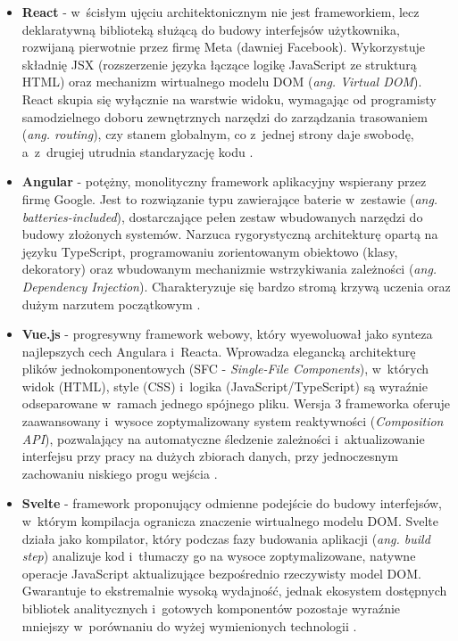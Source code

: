 \begin{itemize}
	\item \textbf{React} - w~ścisłym ujęciu architektonicznym nie jest frameworkiem, lecz deklaratywną biblioteką służącą do budowy interfejsów użytkownika, rozwijaną pierwotnie przez firmę Meta (dawniej Facebook).
	      Wykorzystuje składnię JSX (rozszerzenie języka łączące logikę JavaScript ze strukturą HTML) oraz mechanizm wirtualnego modelu DOM (\textit{ang. Virtual DOM}).
	      React skupia się wyłącznie na warstwie widoku, wymagając od programisty samodzielnego doboru zewnętrznych narzędzi do zarządzania trasowaniem (\textit{ang. routing}), czy stanem globalnym, co z~jednej strony daje swobodę, a~z~drugiej utrudnia standaryzację kodu \cite{react_dev_learn}.

	\item \textbf{Angular} - potężny, monolityczny framework aplikacyjny wspierany przez firmę Google.
	      Jest to rozwiązanie typu zawierające baterie w~zestawie (\textit{ang. batteries-included}), dostarczające pełen zestaw wbudowanych narzędzi do budowy złożonych systemów.
	      Narzuca rygorystyczną architekturę opartą na języku TypeScript, programowaniu zorientowanym obiektowo (klasy, dekoratory) oraz wbudowanym mechanizmie wstrzykiwania zależności (\textit{ang. Dependency Injection}).
	      Charakteryzuje się bardzo stromą krzywą uczenia oraz dużym narzutem początkowym \cite{angular_overview}.

	\item \textbf{Vue.js} - progresywny framework webowy, który wyewoluował jako synteza najlepszych cech Angulara i~Reacta.
	      Wprowadza elegancką architekturę plików jednokomponentowych (SFC - \textit{Single-File Components}), w~których widok (HTML), style (CSS) i~logika (JavaScript/TypeScript) są wyraźnie odseparowane w~ramach jednego spójnego pliku.
	      Wersja 3 frameworka oferuje zaawansowany i~wysoce zoptymalizowany system reaktywności (\textit{Composition API}), pozwalający na automatyczne śledzenie zależności i~aktualizowanie interfejsu przy pracy na dużych zbiorach danych, przy jednoczesnym zachowaniu niskiego progu wejścia \cite{vuejs_guide_introduction}.

	\item \textbf{Svelte} - framework proponujący odmienne podejście do budowy interfejsów, w~którym kompilacja ogranicza znaczenie wirtualnego modelu DOM.
	      Svelte działa jako kompilator, który podczas fazy budowania aplikacji (\textit{ang. build step}) analizuje kod i~tłumaczy go na wysoce zoptymalizowane, natywne operacje JavaScript aktualizujące bezpośrednio rzeczywisty model DOM.
	      Gwarantuje to ekstremalnie wysoką wydajność, jednak ekosystem dostępnych bibliotek analitycznych i~gotowych komponentów pozostaje wyraźnie mniejszy w~porównaniu do wyżej wymienionych technologii \cite{svelte_welcome}.
\end{itemize}


